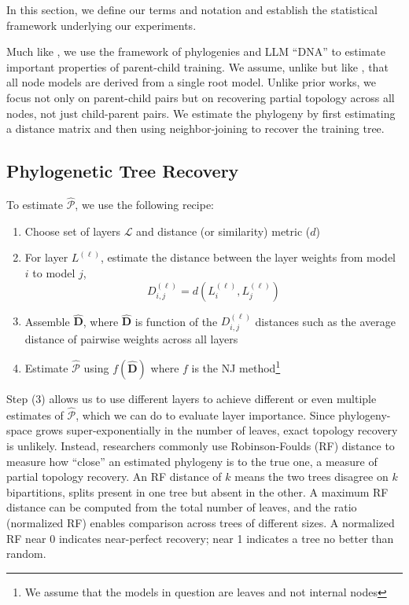 \documentclass{article}
\theoremstyle{definition}
\theoremstyle{plain}
\begin{document}
In this section, we define our terms and notation and establish the statistical framework underlying our experiments.


Much like \citep{wu2026llmdna}, we use the framework of phylogenies and LLM ``DNA'' to estimate important properties of parent-child training. We assume, unlike \citep{horwitz2025mother} but like \citep{yu2025neural}, that all node models are derived from a single root model. Unlike prior works, we focus not only on parent-child pairs but on recovering partial topology across all nodes, not just child-parent pairs.  We estimate the phylogeny by first estimating a distance matrix and then using neighbor-joining \citep{saitou1987neighbor} to recover the training tree.


\subsection{Phylogenetic Tree Recovery}
\label{sec:framework:phylo}

To estimate $\widehat{\mathcal{P}}$, we use the following recipe:

\begin{enumerate}
    \item Choose set of layers $\mathcal{L}$ and distance (or similarity) metric ($d$)
    \item For layer $L^{(\ell)}$, estimate the distance between the layer weights from model $i$ to model $j$,
    $$
    D_{i,j}^{(\ell)} = d(L^{(\ell)}_i, L^{(\ell)}_j)
    $$
    \item Assemble $\hat{\textbf{D}}$, where $\hat{\textbf{D}}$ is function of the $D_{i,j}^{(\ell)}$ distances such as the average distance of pairwise weights across all layers
    \item Estimate $\widehat{{\mathcal{P}}}$ using $f(\hat{\textbf{D}})$ where $f$ is the NJ method\footnote{We assume that the models in question are leaves and not internal nodes}
\end{enumerate}

Step (3) allows us to use different layers to achieve different or even multiple estimates of $\widehat{\mathcal{P}}$, which we can do to evaluate layer importance.  Since phylogeny-space grows super-exponentially in the number of leaves, exact topology recovery is unlikely.
Instead, researchers commonly use Robinson-Foulds (RF) distance \citep{robinson1981comparison} to measure how ``close'' an estimated phylogeny is to the true one, a measure of partial topology recovery. An RF distance of $k$ means the two trees disagree on $k$ bipartitions, splits present in one tree but absent in the other.
A maximum RF distance can be computed from the total number of leaves, and the ratio (normalized RF) enables comparison across trees of different sizes. A normalized RF near 0 indicates near-perfect recovery; near 1 indicates a tree no better than random.
\end{document}
